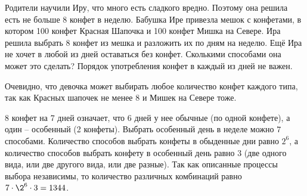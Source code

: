 
Родители научили Иру, что много есть сладкого вредно. Поэтому она решила есть не больше 8 конфет в неделю. Бабушка Ире привезла мешок с конфетами, в котором 100 конфет Красная Шапочка и 100 конфет Мишка на Севере. Ира решила выбрать 8 конфет из мешка и разложить их по дням на неделю. Ещё Ира не хочет в любой из дней оставаться без конфет. Сколькими способами она может это сделать? Порядок употребления конфет в каждый из дней не важен.

\solutionSection

Очевидно, что девочка может выбирать любое количество конфет каждого типа, так как Красных шапочек не менее 8 и Мишек на Севере тоже. 

8 конфет на 7 дней означает, что 6 дней у нее обычные (по одной конфете), а один -- особенный (2 конфеты). Выбрать особенный день в неделе можно $7$ способами. Количество способов выбрать конфеты в обыденные дни равно $2^6$, а количество способов выбрать конфету в особенный день равно $3$ (две одного вида, или две другого вида, или две разные). Так как описанные процессы выбора независимы, то количество различных комбинаций равно $7 \cdot \2^6 \cdot 3 = 1344$.


